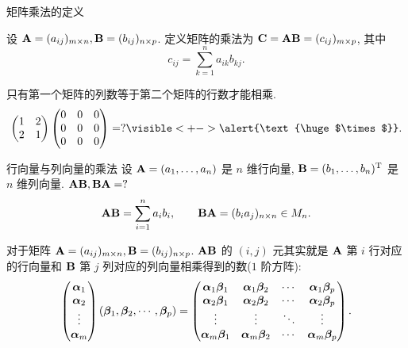 \begin{frame}{矩阵乘法的定义}
	\onslide<+->
	\begin{definition}
		设 ${\mathbf{A}}=(a_{ij})_{m\times n}, {\mathbf{B}}=(b_{ij})_{n\times p}$.
		定义矩阵的乘法为  ${\mathbf{C}}={\mathbf{A}}{\mathbf{B}}=(c_{ij})_{m\times p}$, 其中
		\[c_{ij}=\sum_{k=1}^n a_{ik}b_{kj}.\]
	\end{definition}
	\onslide<+->
	只有第一个矩阵的列数等于第二个矩阵的行数才能相乘.
	\onslide<+->
	\[\begin{pmatrix}
		1&2\\2&1
	\end{pmatrix}\begin{pmatrix}
		0&0&0\\0&0&0\\0&0&0
	\end{pmatrix}=?\visible<+->{\alert{\text{\huge$\times$}}}.\]
\end{frame}


\begin{frame}{行向量与列向量的乘法}
	\onslide<+->
	设 ${\mathbf{A}}=(a_1,\dots,a_n)$ 是 $n$ 维行向量, ${\mathbf{B}}=(b_1,\dots,b_n)^{\mathrm{T}}$ 是 $n$ 维列向量.
	\onslide<+->
	${\mathbf{A}}{\mathbf{B}},{\mathbf{B}}{\mathbf{A}}=?$
	\onslide<+->
	\[{\mathbf{A}}{\mathbf{B}}=\sum_{i=1}^n a_i b_i,\qquad
	{\mathbf{B}}{\mathbf{A}}=(b_ia_j)_{n\times n}\in M_n.\]

	\onslide<+->
	对于矩阵 ${\mathbf{A}}=(a_{ij})_{m\times n}, {\mathbf{B}}=(b_{ij})_{n\times p}$.
	\onslide<+->
	${\mathbf{A}}{\mathbf{B}}$ 的 $(i,j)$ 元其实就是 ${\mathbf{A}}$ 第 $i$ 行对应的行向量和 ${\mathbf{B}}$ 第 $j$ 列对应的列向量相乘得到的数($1$ 阶方阵):
	\[\begin{pmatrix}
		{\boldsymbol{\alpha}}_1\\
		{\boldsymbol{\alpha}}_2\\
		\vdots\\
		{\boldsymbol{\alpha}}_m
	\end{pmatrix}({\boldsymbol{\beta}}_1,{\boldsymbol{\beta}}_2,\cdots,{\boldsymbol{\beta}}_p)=\begin{pmatrix}
		{\boldsymbol{\alpha}}_1{\boldsymbol{\beta}}_1&{\boldsymbol{\alpha}}_1{\boldsymbol{\beta}}_2&\cdots&{\boldsymbol{\alpha}}_1{\boldsymbol{\beta}}_p\\
		{\boldsymbol{\alpha}}_2{\boldsymbol{\beta}}_1&{\boldsymbol{\alpha}}_2{\boldsymbol{\beta}}_2&\cdots&{\boldsymbol{\alpha}}_2{\boldsymbol{\beta}}_p\\
		\vdots&\vdots&\ddots&\vdots\\
		{\boldsymbol{\alpha}}_m{\boldsymbol{\beta}}_1&{\boldsymbol{\alpha}}_m{\boldsymbol{\beta}}_2&\cdots&{\boldsymbol{\alpha}}_m{\boldsymbol{\beta}}_p
	\end{pmatrix}.\]
\end{frame}


